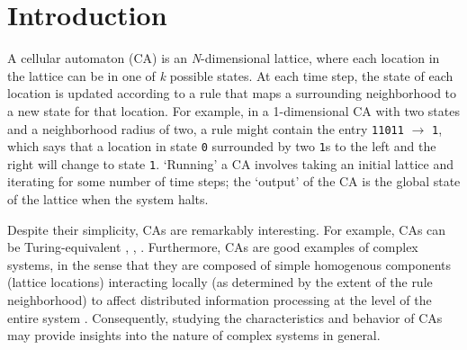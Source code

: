 \section{Introduction}

A cellular automaton (CA) is an \textit{N}-dimensional lattice, where each location in the lattice can be in one of \textit{k} possible states. 
At each time step, the state of each location is updated according to a rule that maps a surrounding neighborhood to 
a new state for that location. For example, in a 1-dimensional CA with two states and a neighborhood radius of two, a rule might contain the entry \texttt{11011} 
$\rightarrow$ \texttt{1}, which says that a location in state \texttt{0} surrounded by two \texttt{1}s to the left and the right will change to state \texttt{1}. 
`Running' a CA involves taking an initial lattice and iterating for some number of time steps; the `output' of the CA is the global state of the 
lattice when the system halts.

Despite their simplicity, CAs are remarkably interesting. For example, CAs can be Turing-equivalent \cite{cook_concrete_2009}, 
\cite{berlekamp_winning_1982}, \cite{adamatzky_turing_2001}. Furthermore, CAs are good examples of complex systems, in the sense that 
they are composed of simple homogenous components (lattice locations) interacting locally (as determined by the extent of the rule neighborhood) to affect  distributed information processing at the level of the entire system \cite{mitchell_complexity:_2009}. Consequently, studying the characteristics and 
behavior of CAs may provide insights into the nature of complex systems in general. 

